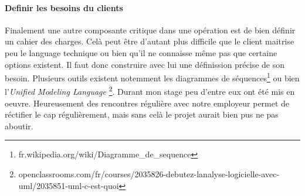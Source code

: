 \paragraph{Definir les besoins du clients}
Finalement une autre composante critique dans une opération est de bien définir un cahier des charges. Celà peut être d'autant plus difficile que le client maitrise peu le language technique ou bien qu'il ne connaisse même pas que certaine options existent. Il faut donc construire avec lui une définission précise de son besoin. Plusieurs outils existent notemment les diagrammes de séquences\footnote{fr.wikipedia.org/wiki/Diagramme\_de\_sequence}  ou bien l'\textit{Unified Modeling Language} \footnote{openclassrooms.com/fr/courses/2035826-debutez-lanalyse-logicielle-avec-uml/2035851-uml-c-est-quoi}. Durant mon stage peu d'entre eux ont été mis en oeuvre. Heureusement des rencontres régulière avec notre employeur permet de réctifier le cap régulièrement, mais sans celà le projet aurait bien pus ne pas aboutir.
